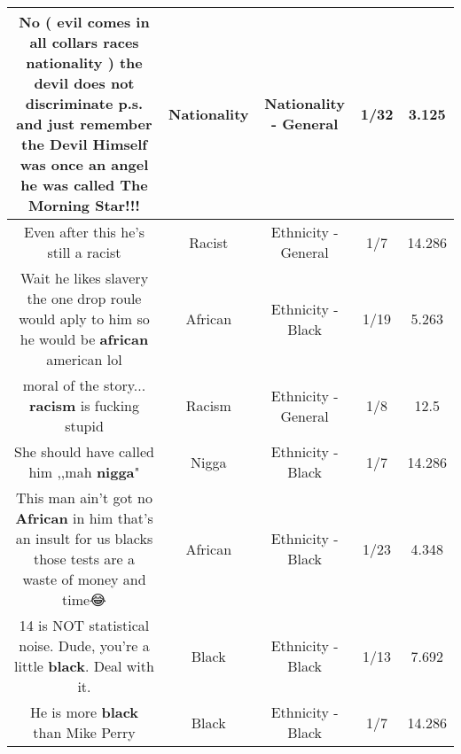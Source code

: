 \documentclass[11pt]{article}
\newlength\mylength
\begin{document}
\begin{center}
\begin{longtable}{|C{.65\mylength}|C{.30\mylength}|C{.12\mylength}|C{.12\mylength}|C{.12\mylength}|}
  \small No ( evil comes in all collars races \textbf{nationality} ) the devil does not discriminate p.s. and just remember the Devil Himself was once an angel he was called The Morning Star!!!\normalsize   & Nationality & Nationality - General & 1/32 & 3.125 \\  \hline
  \small Even after this he's still a racist\normalsize   & Racist & Ethnicity - General & 1/7 & 14.286 \\  \hline
  \small Wait he likes slavery the one drop roule would aply to him so he would be \textbf{african} american lol\normalsize   & African & Ethnicity - Black & 1/19 & 5.263 \\  \hline
  \small moral of the story... \textbf{racism} is fucking stupid\normalsize   & Racism & Ethnicity - General & 1/8 & 12.5 \\  \hline
  \small She should have called him ,,mah \textbf{nigga}"\normalsize   & Nigga & Ethnicity - Black & 1/7 & 14.286 \\  \hline
  \small This man ain't got no \textbf{African} in him that's an insult for us blacks those tests are a waste of money and time😂\normalsize   & African & Ethnicity - Black & 1/23 & 4.348 \\  \hline
  \small 14 is NOT statistical noise. Dude, you're a little \textbf{black}. Deal with it.\normalsize   & Black & Ethnicity - Black & 1/13 & 7.692 \\  \hline
  \small He is more \textbf{black} than Mike Perry\normalsize   & Black & Ethnicity - Black & 1/7 & 14.286 \\  \hline

\end{longtable}
\end{center}
\end{document}

